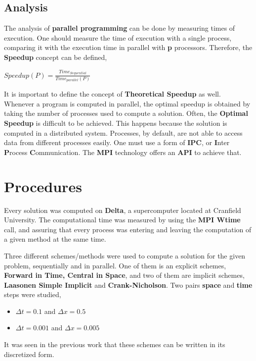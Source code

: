\documentclass[12pt]{article}
\begin{document}
\subsection*{Analysis}
\par The analysis of \textbf{parallel programming} can be done by measuring times of execution. One should measure the time of execution with a single process, comparing it with the execution time in parallel with \textbf{p} processors. Therefore, the \textbf{Speedup} concept can be defined\cite{speedup},
\newline
\begin{center}
$
	Speedup(P) = \frac{Time_{Sequential}}{Time_{parallel}(P)}
$
\end{center}
\hfill
\par It is important to define the concept of \textbf{Theoretical Speedup} as well. Whenever a program is computed in parallel, the optimal speedup is obtained by taking the number of processes used to compute a solution. Often, the \textbf{Optimal Speedup} is difficult to be achieved. This happens because the solution is computed in a distributed system. Processes, by default, are not able to access data from different processes easily. One must use a form of \textbf{IPC}, or \textbf{I}nter \textbf{P}rocess \textbf{C}ommunication. The \textbf{MPI} technology offers an \textbf{API} to achieve that. 

\section*{Procedures}

\par Every solution was computed on \textbf{Delta}, a supercomputer located at Cranfield University. The computational time was measured by using the \textbf{MPI Wtime} call, and assuring that every process was entering and leaving the computation of a given method at the same time. 
\par Three different schemes/methods were used to compute a solution for the given problem, sequentially and in parallel. One of them is an explicit schemes, \textbf{Forward in Time, Central in Space}, and two of them are implicit schemes, \textbf{Laasonen Simple Implicit} and \textbf{Crank-Nicholson}. Two pairs \textbf{space} and \textbf{time} steps were studied,
\begin{itemize}[noitemsep] 
\item $ \Delta t = 0.1 $ and $ \Delta x = 0.5$
\item $ \Delta t = 0.001 $ and $ \Delta x = 0.005$
\end{itemize}
It was seen in the previous work\cite{fraga} that these schemes can be written in its discretized form.
\end{document}
